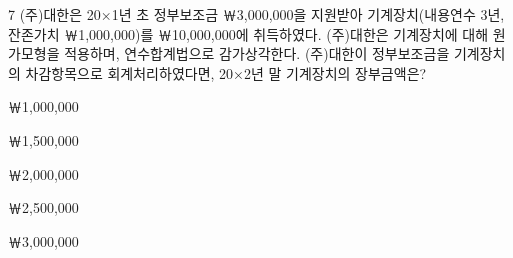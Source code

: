\begin{question}{7}
(주)대한은 20×1년 초 정부보조금 ￦3,000,000을 지원받아 기계장치(내용연수 3년, 잔존가치 ￦1,000,000)를 ￦10,000,000에 취득하였다. (주)대한은 기계장치에 대해 원가모형을 적용하며, 연수합계법으로 감가상각한다. (주)대한이 정부보조금을 기계장치의 차감항목으로 회계처리하였다면, 20×2년 말 기계장치의 장부금액은?
\begin{choices}
  \item ￦1,000,000
  \item ￦1,500,000
  \item ￦2,000,000
  \item ￦2,500,000
  \item ￦3,000,000
\end{choices}
\end{question}
